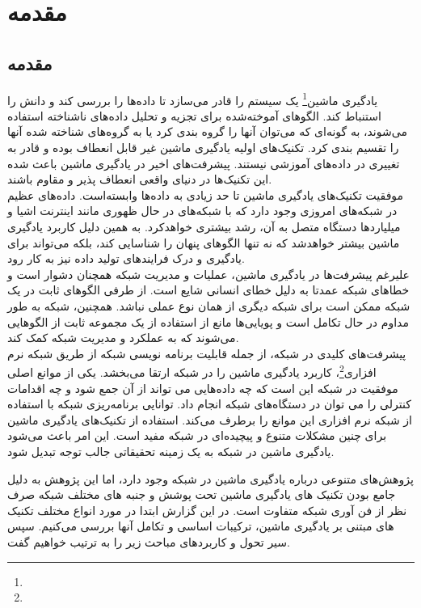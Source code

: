 \chapter{مقدمه}
\section{مقدمه}

یادگیری ماشین\footnote{} یک سیستم را قادر می‌سازد تا داده‌ها را بررسی کند و دانش را استنباط کند. الگوهای آموخته‌شده برای تجزیه و تحلیل داده‌های ناشناخته استفاده می‌شوند، به گونه‌ای که می‌توان آنها را گروه بندی کرد یا به گروه‌های شناخته شده آنها را تقسیم بندی کرد. تکنیک‌های اولیه یادگیری ماشین غیر قابل انعطاف بوده و قادر به تغییری در داده‌های آموزشی نیستند. پیشرفت‌های اخیر در یادگیری ماشین باعث شده این تکنیک‌ها در دنیای واقعی انعطاف پذیر و مقاوم باشند.
\\
موفقیت تکنیک‌های یادگیری ماشین تا حد زیادی به داده‌ها وابسته‌است. داده‌های عظیم در شبکه‌های امروزی وجود دارد که با شبکه‌های در حال ظهوری مانند اینترنت اشیا و میلیاردها دستگاه متصل به آن، رشد بیشتری خواهدکرد. به همین دلیل کاربرد یادگیری ماشین بیشتر خواهدشد که نه تنها الگوهای پنهان را شناسایی کند، بلکه می‌تواند برای یادگیری و درک فرایندهای تولید داده نیز به کار رود.
\\
علیرغم پیشرفت‌ها در یادگیری ماشین، عملیات و مدیریت شبکه همچنان دشوار است و خطاهای شبکه عمدتا به دلیل خطای انسانی شایع است. از طرفی الگوهای ثابت در یک شبکه ممکن است برای شبکه دیگری از همان نوع عملی نباشد. همچنین، شبکه به طور مداوم در حال تکامل است و پویایی‌ها مانع از استفاده از یک مجموعه ثابت از الگوهایی می‌شوند که به عملکرد و مدیریت شبکه کمک کند.
\\
پیشرفت‌های کلیدی در شبکه، از جمله قابلیت برنامه نویسی شبکه از طریق شبکه نرم افزاری\footnote{}، کاربرد یادگیری ماشین را در شبکه ارتقا می‌بخشد. یکی از موانع اصلی موفقیت در شبکه‌ این است که چه داده‌هایی می تواند از آن جمع شود و چه اقدامات کنترلی را می توان در دستگاه‌های شبکه انجام داد. توانایی برنامه‌ریزی شبکه با استفاده از شبکه نرم افزاری این موانع را برطرف می‌کند. استفاده از تکنیک‌های یادگیری ماشین برای چنین مشکلات متنوع و پیچیده‌ای در شبکه مفید است. این امر باعث می‌شود یادگیری ماشین در شبکه به یک زمینه تحقیقاتی جالب توجه تبدیل شود\cite{boutaba2018comprehensive}.

\newpage

پژوهش‌های متنوعی درباره یادگیری ماشین در شبکه وجود دارد، اما این پژوهش به دلیل جامع بودن تکنیک های یادگیری ماشین تحت پوشش و جنبه های مختلف شبکه صرف نظر از فن آوری شبکه متفاوت است. در این گزارش ابتدا در مورد انواع مختلف تکنیک های مبتنی بر یادگیری ماشین، ترکیبات اساسی و تکامل آنها بررسی می‌کنیم. سپس سیر تحول و کاربردهای مباحث زیر را به ترتیب خواهیم گفت.


